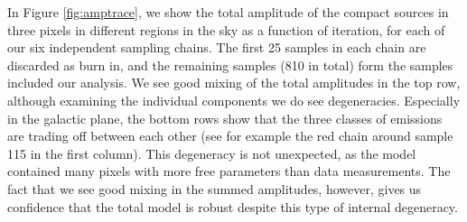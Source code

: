 \documentclass{aa}
\begin{document}
In Figure \ref{fig:amptrace}, we show the total amplitude of the compact sources in three pixels in different regions in the sky as a function of iteration, for each of our six independent sampling chains. The first 25 samples in each chain are discarded as burn in, and the remaining samples (810 in total) form the samples included our analysis. We see good mixing of the total amplitudes in the top row, although examining the individual components we do see degeneracies.
Especially in the galactic plane, the bottom rows show that the three classes of emissions are trading off between each other (see for example the red chain around sample 115 in the first column). This degeneracy is not unexpected, as the model contained many pixels with more free parameters than data measurements. The fact that we see good mixing in the summed amplitudes, however, gives us confidence that the total model is robust despite this type of internal degeneracy.
\end{document}
